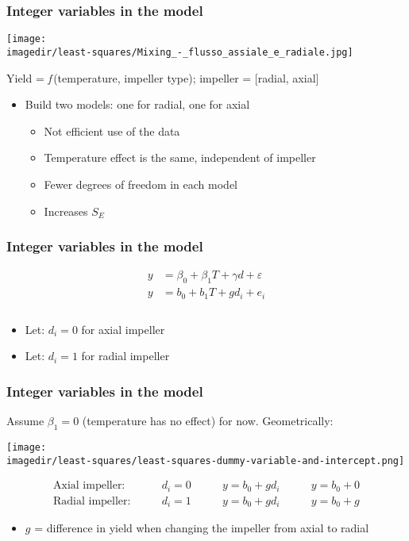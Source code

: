 \begin{frame}\frametitle{Integer variables in the model}
	\begin{center}
		\texttt{[image: \\imagedir/least-squares/Mixing\_-\_flusso\_assiale\_e\_radiale.jpg]}
	\end{center}

	Yield = \emph{f}\,(temperature, impeller type); impeller = [radial, axial]
	\begin{itemize}
		\item	Build two models: one for radial, one for axial
		\begin{itemize}
			\item	Not efficient use of the data
			\item	Temperature effect is the same, independent of impeller
			\item	Fewer degrees of freedom in each model
			\item	Increases $S_E$
		\end{itemize}
	\end{itemize}
\end{frame}

\begin{frame}\frametitle{Integer variables in the model}
	$$
	\begin{array}{lr}
		y &= \beta_0 + \beta_1 T + \gamma d + \varepsilon \\
		y &= b_0 + b_1 T + g d_i + e_i \\
		\\
	\end{array}
	$$
	\begin{itemize}
		\item	Let: $d_i = 0$ for axial impeller
		\item	Let: $d_i = 1$ for radial impeller
	\end{itemize}
\end{frame}

\begin{frame}\frametitle{Integer variables in the model}

	Assume $\beta_1 = 0$ (temperature has no effect) for now. Geometrically:
	\begin{center}
		\texttt{[image: \\imagedir/least-squares/least-squares-dummy-variable-and-intercept.png]}
	\end{center}
	$$
	\begin{array}{llll}
		\text{Axial impeller:} \qquad & d_i=0 &\qquad y = b_0 + gd_i &\qquad y = b_0 + 0 \\
		\text{Radial impeller:} \qquad & d_i=1 &\qquad y = b_0 + gd_i & \qquad y = b_0 + g
	\end{array}
	$$
	\begin{itemize}
		\item	$g$ = difference in yield when changing the impeller from axial to radial
	\end{itemize}
\end{frame}

